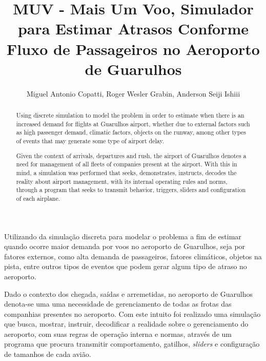 \documentclass[12pt]{article}
\title{MUV - Mais Um Voo, Simulador para Estimar Atrasos Conforme Fluxo de
    Passageiros no Aeroporto de Guarulhos}
\author{Miguel Antonio Copatti\inst{1}, Roger Wesler Grabin\inst{2}, Anderson Seiji Ishiii\inst{3}}
\begin{document}
 
  
  \maketitle
  
  \begin{abstract}
    Using discrete simulation to model the problem in order to estimate when there is
    an increased demand for flights at Guarulhos airport, whether due to external
    factors such as high passenger demand, climatic factors, objects on the runway,
    among other types of events that may generate some type of airport delay.
  
    Given the context of arrivals, departures and rush, the airport of Guarulhos denotes 
    a need for management of all fleets of companies present at the airport.
    With this in mind, a simulation was performed that seeks, demonstrates,
    instructs, decodes the reality about airport management, with its internal operating
    rules and norms, through a program that seeks to transmit behavior, triggers, sliders
    and configuration of each airplane.
    
  \end{abstract}
       
  \begin{resumo} 
  
  
  
    Utilizando da simulação discreta para modelar o problema a fim de estimar quando ocorre maior
    demanda por voos no aeroporto de Guarulhos, seja por fatores externos, como alta demanda de 
    passageiros, fatores climáticos, objetos na pista, entre outros tipos de eventos que podem 
    gerar algum tipo de atraso no aeroporto.
  
    Dado o contexto dos chegada, saídas e arremetidas, no aeroporto de Guarulhos denota-se uma
    uma necessidade de gerenciamento de todas as frotas das companhias presentes no aeroporto.
    Com este intuito foi realizado uma simulação que busca, mostrar, instruir, decodificar a
    realidade sobre o gerenciamento do aeroporto, com suas regras de operação interna e normas, 
    através de um programa que procura transmitir comportamento, gatilhos, \textit{sliders} e configuração
    de tamanhos de cada avião.
   
  
  \end{resumo}
  
\end{document}
